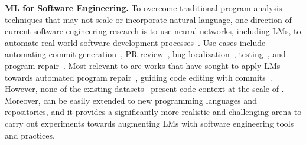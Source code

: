 \textbf{ML for Software Engineering.}
To overcome traditional program analysis techniques that may not scale or incorporate natural language, one direction of current software engineering research is to use neural networks, including LMs, to automate real-world software development processes~\citep{google-didact,zheng2023towards,hou2023large}.
Use cases include automating commit generation~\citep{jung2021commitbert,liu2023commitbart}, PR review~\citep{Yang2016MSR,li2022automating,tufano2021automating}, bug localization~\citep{kim2019precise,chakraborty2018entropy}, testing~\citep{kang2023large,xia2023universal,wang2023software}, and program repair~\citep{gupta2017deepfix,allamanis2017learning,Monperrus_2018,jiang2018shaping,goues2019automated,gao2022program,dinh2023large,motwani2023better}.
Most relevant to \benchmark{} are works that have sought to apply LMs towards automated program repair~\citep{xia2022less,xia2023conversational,fan2023automated,sobania2023analysis}, guiding code editing with commits~\citep{chakraborty2021multimodal,zhang2022coditt5,fakhoury2023generating}.
However, none of the existing datasets~\citep{justJE2014defects,Karampatsis2019HowOD} present code context at the scale of \benchmark{}.
Moreover, \benchmark{} can be easily extended to new programming languages and repositories, and it provides a significantly more realistic and challenging arena to carry out experiments towards augmenting LMs with software engineering tools and practices.